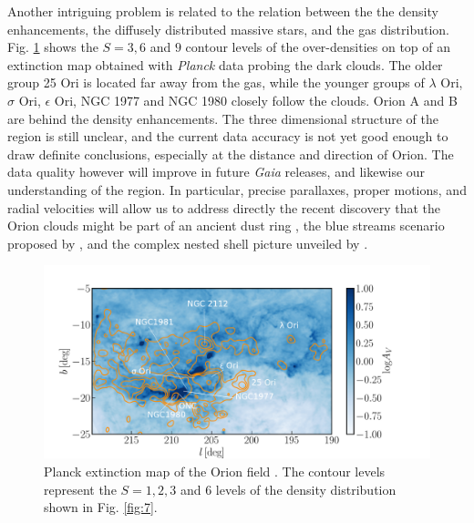 \documentclass[onecolumn]{aa} %
\begin{document}
 

Another intriguing problem is related to the relation between the the density enhancements, the diffusely distributed massive stars, and the gas distribution. 
Fig. \ref{fig:16} shows the $S = 3, 6$ and $9$ contour levels of the over-densities on top of an extinction map obtained with \textit{Planck} data \citep{Planck2014} probing the dark clouds. The older group 25 Ori is located far away from the gas, while the younger groups of $\lambda$ Ori, $\sigma$ Ori, $\epsilon$ Ori, NGC 1977 and NGC 1980 closely follow the clouds. Orion A and B are behind the density enhancements.
The three dimensional structure of the region is still unclear, and the current data accuracy is not yet good enough to draw definite conclusions, especially at the distance and direction of Orion. The data quality however will improve  in future \textit{Gaia} releases, and likewise our understanding of the region. In particular, precise parallaxes, proper motions, and radial velocities will allow us to address directly the recent discovery that the Orion clouds might be part of an ancient dust ring \citep{Schlafly2015}, the blue streams scenario proposed by \cite{Bouy2015}, and the complex nested shell picture unveiled by \cite{Ochsendorf2015}.


\begin{figure}
\includegraphics[width = \hsize]{fig14_labels.pdf}
\caption{Planck extinction map of the Orion field \citep{Planck2014}. The contour levels represent the $S = 1,2,3$ and 6 levels of the density distribution shown in Fig. \ref{fig:7}.}
\label{fig:16}
\end{figure}
\end{document}
